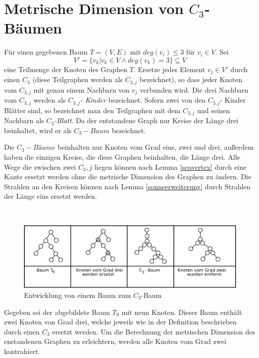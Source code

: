 \section{Metrische Dimension von $C_3$-Bäumen}
\begin{defi}
\label{C_{3} tree}
Für einen gegebenen Baum $T=(V,E)$ mit $deg(v_i)\leq 3$ für $v_i \in V$. Sei $$V'=\{v_k|v_k \in V \wedge deg(v_k)=3\}\subseteq V$$ eine Teilmenge der Knoten des Graphen $T$. Ersetze jedes Element $v_j \in V'$ durch einen $C_3$ (diese Teilgraphen werden als \emph{$C_{3,j}$} bezeichnet), so dass jeder Knoten vom $C_{3,j}$ mit genau einem Nachbarn von $v_j$ verbunden wird. Die drei Nachbarn vom $C_{3,j}$ werden als \emph{$C_{3,j}$- Kinder} bezeichnet. Sofern zwei von den $C_{3,j}$- Kinder Blätter sind, so bezeichnet man den Teilgraphen mit dem $C_{3,j}$ und seinen Nachbarn als \emph{$C_{3}$-Blatt}. Da der entstandene Graph nur Kreise der Länge drei beinhaltet, wird er als \emph{$C_3-Baum$} bezeichnet. 
   \end{defi}
   \begin{bem}
Die $C_3-Bäume$ beinhalten nur Knoten vom Grad eins, zwei und drei, außerdem haben die einzigen Kreise, die diese Graphen beinhalten, die Länge drei. Alle Wege die zwischen zwei $C_3,j$ liegen können nach Lemma \ref{sepvertex} durch eine Kante ersetzt werden ohne die metrische Dimension des Graphen zu ändern. Die Strahlen an den Kreisen können nach Lemma \ref{sonneerweiterung} durch Strahlen der Länge eins ersetzt werden.
\end{bem} 
\begin{bsp}~
\begin{figure}[h!]
		\centering 		 
   \includegraphics[width=428pt]{bilder/trees.pdf}
	\caption{Entwicklung von einem Baum zum $C_{3}$-Baum}
  	 \end{figure}
\end{bsp}
Gegeben sei der abgebildete Baum $T_9$ mit neun Knoten. Dieser Baum enthält zwei Knoten von Grad drei, welche jeweils wie in der Definition beschrieben durch einen $C_3$ ersetzt werden. Um die Berechnung der metrischen Dimension des enstandenen Graphen zu erleichtern, werden alle Knoten vom Grad zwei kontrahiert.
